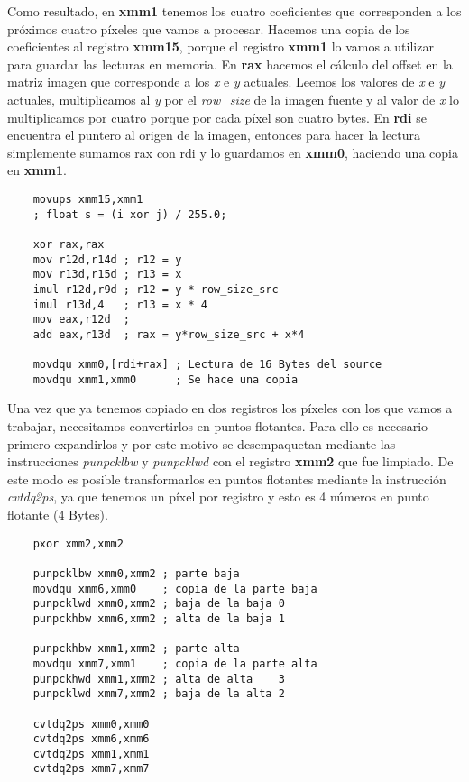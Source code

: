 \documentclass[a4paper]{article}
\begin{document}
\indent Como resultado, en \textbf{xmm1} tenemos los cuatro coeficientes que corresponden a los próximos cuatro p\'ixeles que vamos a procesar. Hacemos una copia de los coeficientes al registro \textbf{xmm15}, porque el registro \textbf{xmm1} lo vamos a utilizar para guardar las lecturas en memoria. En \textbf{rax} hacemos el c\'alculo del offset en la matriz imagen que corresponde a los \emph{x} e \emph{y} actuales. Leemos los valores de \emph{x} e \emph{y} actuales, multiplicamos al \emph{y} por el \textit{row_size} de la imagen fuente y al valor de \emph{x} lo multiplicamos por cuatro porque por cada p\'ixel son cuatro bytes. En \textbf{rdi} se encuentra el puntero al origen de la imagen, entonces para hacer la lectura simplemente sumamos rax con rdi y lo guardamos en \textbf{xmm0}, haciendo una copia en \textbf{xmm1}.
 \begin{codesnippet}
\begin{verbatim}
    movups xmm15,xmm1  
    ; float s = (i xor j) / 255.0;

    xor rax,rax
    mov r12d,r14d ; r12 = y
    mov r13d,r15d ; r13 = x
    imul r12d,r9d ; r12 = y * row_size_src
    imul r13d,4   ; r13 = x * 4
    mov eax,r12d  ; 
    add eax,r13d  ; rax = y*row_size_src + x*4 
    
    movdqu xmm0,[rdi+rax] ; Lectura de 16 Bytes del source
    movdqu xmm1,xmm0      ; Se hace una copia
\end{verbatim}
\end{codesnippet}

\indent Una vez que ya tenemos copiado en dos registros los p\'ixeles con los que vamos a trabajar, necesitamos convertirlos en puntos flotantes. Para ello es necesario primero expandirlos y por este motivo se desempaquetan mediante las instrucciones \textit{punpcklbw} y \textit{punpcklwd} con el registro \textbf{xmm2} que fue limpiado. De este modo es posible transformarlos en puntos flotantes mediante la instrucci\'on \textit{cvtdq2ps}, ya que tenemos un p\'ixel por registro y esto es 4 n\'umeros en punto flotante (4 Bytes).
 \begin{codesnippet}
\begin{verbatim}
    pxor xmm2,xmm2

    punpcklbw xmm0,xmm2 ; parte baja 
    movdqu xmm6,xmm0    ; copia de la parte baja
    punpcklwd xmm0,xmm2 ; baja de la baja 0 
    punpckhbw xmm6,xmm2 ; alta de la baja 1

    punpckhbw xmm1,xmm2 ; parte alta           
    movdqu xmm7,xmm1    ; copia de la parte alta
    punpckhwd xmm1,xmm2 ; alta de alta    3
    punpcklwd xmm7,xmm2 ; baja de la alta 2

    cvtdq2ps xmm0,xmm0
    cvtdq2ps xmm6,xmm6
    cvtdq2ps xmm1,xmm1
    cvtdq2ps xmm7,xmm7
\end{verbatim}
\end{codesnippet}
\end{document}
